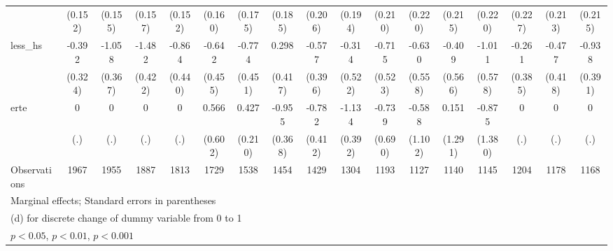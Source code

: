 {\begin{tabular}{l*{16}{c}}
                    &     (0.152)         &     (0.155)         &     (0.157)         &     (0.152)         &     (0.160)         &     (0.175)         &     (0.185)         &     (0.206)         &     (0.194)         &     (0.210)         &     (0.220)         &     (0.215)         &     (0.220)         &     (0.227)         &     (0.213)         &     (0.215)         \\
[1em]
less\_hs             &      -0.392         &      -1.058\sym{**} &      -1.482\sym{***}&      -0.864\sym{*}  &      -0.642         &      -0.774         &       0.298         &      -0.577         &      -0.314         &      -0.715         &      -0.630         &      -0.409         &      -1.011         &      -0.261         &      -0.477         &      -0.938\sym{*}  \\
                    &     (0.324)         &     (0.367)         &     (0.422)         &     (0.440)         &     (0.455)         &     (0.451)         &     (0.417)         &     (0.396)         &     (0.522)         &     (0.523)         &     (0.558)         &     (0.566)         &     (0.578)         &     (0.385)         &     (0.418)         &     (0.391)         \\
[1em]
erte                &           0         &           0         &           0         &           0         &       0.566         &       0.427\sym{*}  &      -0.955\sym{**} &      -0.782         &      -1.134\sym{**} &      -0.739         &      -0.588         &       0.151         &      -0.875         &           0         &           0         &           0         \\
                    &         (.)         &         (.)         &         (.)         &         (.)         &     (0.602)         &     (0.210)         &     (0.368)         &     (0.412)         &     (0.392)         &     (0.690)         &     (1.102)         &     (1.291)         &     (1.380)         &         (.)         &         (.)         &         (.)         \\
\hline
Observations        &        1967         &        1955         &        1887         &        1813         &        1729         &        1538         &        1454         &        1429         &        1304         &        1193         &        1127         &        1140         &        1145         &        1204         &        1178         &        1168         \\
\hline\hline
\multicolumn{17}{l}{\footnotesize Marginal effects; Standard errors in parentheses}\\
\multicolumn{17}{l}{\footnotesize  (d) for discrete change of dummy variable from 0 to 1}\\
\multicolumn{17}{l}{\footnotesize \sym{*} \(p<0.05\), \sym{**} \(p<0.01\), \sym{***} \(p<0.001\)}\\
\end{tabular}
}
